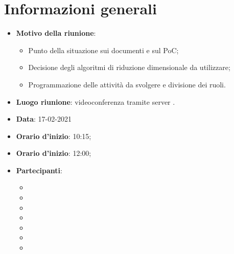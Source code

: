 \section{Informazioni generali}
\begin{itemize}
\item \textbf{Motivo della riunione}: 
\begin{itemize}
\item Punto della situazione sui documenti e sul PoC;
\item Decisione degli algoritmi di riduzione dimensionale da utilizzare;
\item Programmazione delle attività da svolgere e divisione dei ruoli.
\end{itemize}
\item \textbf{Luogo riunione}: videoconferenza tramite server .
\item \textbf{Data}: 17-02-2021
\item \textbf{Orario d'inizio}: 10:15;
\item \textbf{Orario d'inizio}: 12:00;
\item \textbf{Partecipanti}:
	\begin{itemize}
	\item \BM{}
	\item \SG{}
	\item \SP{}
	\item \SH{}
	\item \PA{}
	\item \ZM{}
	\item \RA{}
	\end{itemize}
\end{itemize}

\newpage
